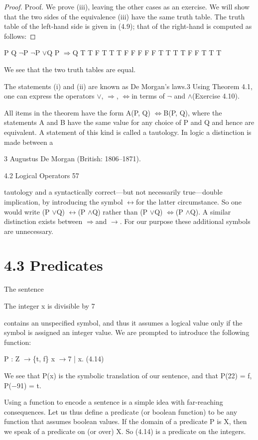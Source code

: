 \documentclass[11pt]{article}
\theoremstyle{plain}
\theoremstyle{definition}
\begin{document}
\begin{proof}
Proof. We prove (iii), leaving the other cases as an exercise. We will show that the two sides of the equivalence (iii) have the same truth table. The truth table of the left-hand side is given in (4.9); that of the right-hand is computed as follows:
\end{proof}

P Q $\neg$P $\neg$P $\lor$Q P $\Rightarrow$Q T T F T T T F F F F F T T T T F F T T T

We see that the two truth tables are equal. 

The statements (i) and (ii) are known as De Morgan's laws.3 Using Theorem 4.1, one can express the operators $\lor$, $\Rightarrow$, $\Leftrightarrow$in terms of $\neg$ and $\land$(Exercise 4.10).

All items in the theorem have the form A(P, Q) $\Leftrightarrow$B(P, Q), where the statements A and B have the same value for any choice of P and Q and hence are equivalent. A statement of this kind is called a tautology. In logic a distinction is made between a

3 Augustus De Morgan (British: 1806--1871).

4.2 Logical Operators 57

tautology and a syntactically correct---but not necessarily true---double implication, by introducing the symbol $\leftrightarrow$for the latter circumstance. So one would write (P $\lor$Q) $\leftrightarrow$(P $\land$Q) rather than (P $\lor$Q) $\Leftrightarrow$(P $\land$Q). A similar distinction exists between $\Rightarrow$and $\to$. For our purpose these additional symbols are unnecessary.

\section{4.3 Predicates}

The sentence

The integer x is divisible by 7

contains an unspecified symbol, and thus it assumes a logical value only if the symbol is assigned an integer value. We are prompted to introduce the following function:

P : Z $\to$\{t, f\} x $\to$7 | x. (4.14)

We see that P(x) is the symbolic translation of our sentence, and that P(22) = f, P($-$91) = t.

Using a function to encode a sentence is a simple idea with far-reaching consequences. Let us thus define a predicate (or boolean function) to be any function that assumes boolean values. If the domain of a predicate P is X, then we speak of a predicate on (or over) X. So (4.14) is a predicate on the integers.
\end{document}
